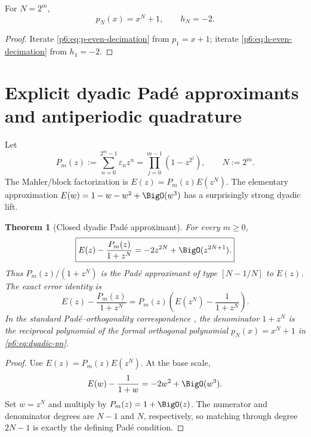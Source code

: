 \documentclass[11pt]{article}
\newtheorem{theorem}{Theorem}[section]
\theoremstyle{definition}
\theoremstyle{remark}
\newcommand{\eps}{\varepsilon}
\begin{document}
\begin{corollary}
\label{p6:cor:dyadic-pn}
For \(N=2^m\),
\begin{equation}
\boxed{
 p_N(x)=x^N+1,
 \qquad h_N=-2.}                                           \label{p6:eq:dyadic-pn}
\end{equation}
\end{corollary}

\begin{proof}
Iterate \eqref{p6:eq:p-even-decimation} from \(p_1=x+1\); iterate
\eqref{p6:eq:h-even-decimation} from \(h_1=-2\).
\end{proof}

\section{Explicit dyadic Pad\'e approximants and antiperiodic quadrature}
\label{p6:sec:dyadic-pade}

Let
\begin{equation}
 P_m(z):=\sum_{n=0}^{2^m-1}\eps_nz^n
        =\prod_{j=0}^{m-1}(1-z^{2^j}),
 \qquad N:=2^m.                                            \label{p6:eq:Pm-def}
\end{equation}
The Mahler/block factorization is \(E(z)=P_m(z)E(z^N)\).  The elementary approximation
\(E(w)=1-w-w^2+\BigO(w^3)\) has a surprisingly strong dyadic lift.

\begin{theorem}[Closed dyadic Pad\'e approximant]
\label{p6:thm:dyadic-pade}
For every \(m\ge0\),
\begin{equation}
\boxed{
 E(z)-\frac{P_m(z)}{1+z^N}
 =-2z^{2N}+\BigO(z^{2N+1}).}                               \label{p6:eq:dyadic-pade}
\end{equation}
Thus \(P_m(z)/(1+z^N)\) is the Pad\'e approximant of type \([N-1/N]\) to \(E(z)\).
The exact error identity is
\begin{equation}
 E(z)-\frac{P_m(z)}{1+z^N}
 =P_m(z)\left(E(z^N)-\frac1{1+z^N}\right).                \label{p6:eq:dyadic-pade-error}
\end{equation}
In the standard Pad\'e--orthogonality correspondence \cite{p6:BakerGravesMorris,p6:Chihara}, the denominator \(1+z^N\) is the reciprocal polynomial of the formal orthogonal
polynomial \(p_N(x)=x^N+1\) in \eqref{p6:eq:dyadic-pn}.
\end{theorem}

\begin{proof}
Use \(E(z)=P_m(z)E(z^N)\).  At the base scale,
\[
 E(w)-\frac1{1+w}=-2w^2+\BigO(w^3).
\]
Set \(w=z^N\) and multiply by \(P_m(z)=1+\BigO(z)\).  The numerator and denominator
degrees are \(N-1\) and \(N\), respectively, so matching through degree \(2N-1\) is
exactly the defining Pad\'e condition.
\end{proof}
\end{document}
